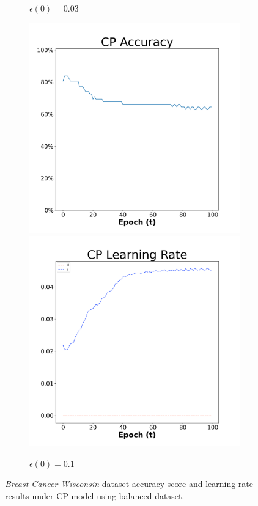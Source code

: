 \begin{figure}[H]
\begin{subfigure}{0.3\textwidth}
  \caption{$\epsilon(0)=0.03$}
\end{subfigure}\hfil %
\begin{subfigure}{0.3\textwidth}
  \includegraphics[width=\linewidth]{images/exper1/breast/CP_0.1_acc.png}
  \includegraphics[width=\linewidth]{images/exper1/breast/CP_0.1_lr.png}
  \caption{$\epsilon(0)=0.1$}
\end{subfigure}

\caption{\textit{Breast Cancer Wisconsin} dataset accuracy score and learning rate results under CP model using balanced dataset.}
\end{figure}

